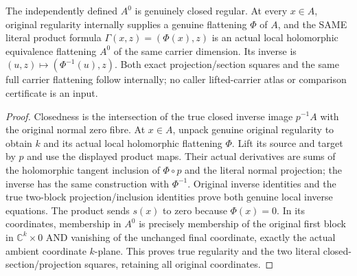 \begin{lemma}
\label{hir:actual-zero-section-submanifold-product-flattening}
\leanok
The independently defined $A^0$ is genuinely closed regular. At every $x\in A$, original regularity internally supplies a genuine flattening $\Phi$ of $A$, and the SAME literal product formula $\Gamma(x,z)=(\Phi(x),z)$ is an actual local holomorphic equivalence flattening $A^0$ of the same carrier dimension. Its inverse is $(u,z)\mapsto(\Phi^{-1}(u),z)$. Both exact projection/section squares and the same full carrier flattening follow internally; no caller lifted-carrier atlas or comparison certificate is an input.
\end{lemma}
\begin{proof}
Closedness is the intersection of the true closed inverse image $p^{-1}A$ with the original normal zero fibre. At $x\in A$, unpack genuine original regularity to obtain $k$ and its actual local holomorphic flattening $\Phi$. Lift its source and target by $p$ and use the displayed product maps. Their actual derivatives are sums of the holomorphic tangent inclusion of $\Phi\circ p$ and the literal normal projection; the inverse has the same construction with $\Phi^{-1}$. Original inverse identities and the true two-block projection/inclusion identities prove both genuine local inverse equations. The product sends $s(x)$ to zero because $\Phi(x)=0$. In its coordinates, membership in $A^0$ is precisely membership of the original first block in $\mathbb C^k\times0$ AND vanishing of the unchanged final coordinate, exactly the actual ambient coordinate $k$-plane. This proves true regularity and the two literal closed-section/projection squares, retaining all original coordinates.
\end{proof}

